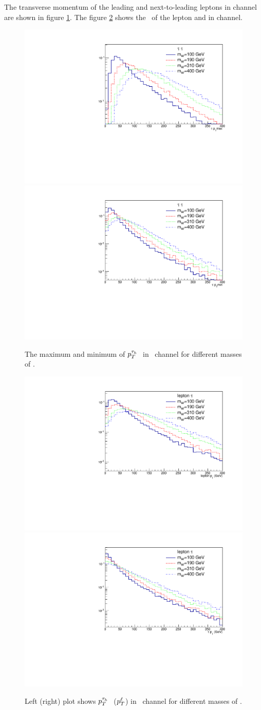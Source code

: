 The transverse momentum of the leading and next-to-leading \Tau leptons in \tauTau channel are shown in figure \ref{fig:pt-hh}. The figure \ref{fig:pt-lh} shows the \pt ~of the lepton and \Tau in \lepTau channel.
\begin{figure}[htb]
  \centering
  \includegraphics*[width=.45\textwidth]{figs/Pt_hh_max.pdf}
  \hspace{3mm}
  \includegraphics*[width=.45\textwidth]{figs/Pt_hh_min.pdf}
  \caption{The maximum  and minimum of $p_T^{\tau_h~}$ in \tauTau ~channel for different masses of \wprime.}
  \label{fig:pt-hh}
\end{figure}
\begin{figure}[htb]
  \centering
  \includegraphics*[width=.45\textwidth]{figs/Pt_lh_tau.pdf}
  \hspace{3mm}
  \includegraphics*[width=.45\textwidth]{figs/Pt_lh_lep.pdf}
  \caption{Left (right) plot shows $p_T^{\tau_h~}$ ($p_T^{\ell}$) in \lepTau ~channel for different masses of \wprime.}
  \label{fig:pt-lh}
\end{figure}

  
